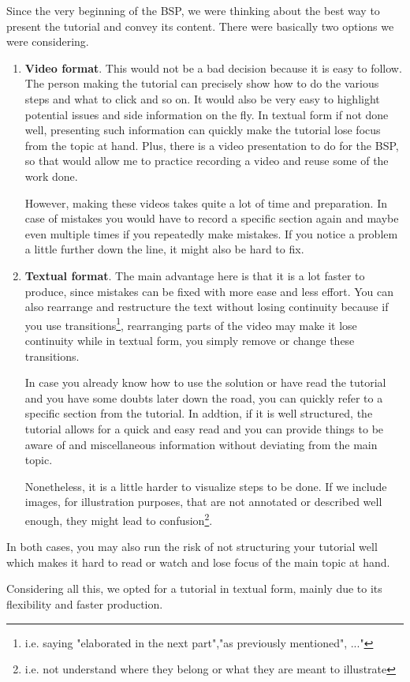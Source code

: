 
Since the very beginning of the BSP, we were thinking about the best
way to present the tutorial and convey its content. There were
basically two options we were considering. 

\begin{enumerate}
	 \item \textbf{Video format}. This would not be a bad decision because it
		is easy to follow. The person making the tutorial can
		precisely show how to do the various steps and what to click
		and so on. It would also be very easy to highlight potential
		issues and side information on the fly. In textual form if
		not done well, presenting such information can quickly make
		the tutorial lose focus from the topic at hand. Plus, there
		is a video presentation to do for the BSP, so that would
		allow me to practice recording a video and reuse some of the
		work done.

		However, making these videos takes quite a lot of time and
		preparation. In case of mistakes you would have to record a
		specific section again and maybe even multiple times if you
		repeatedly make mistakes. If you notice a problem a little
		further down the line, it might also be hard to fix. 

	\item \textbf{Textual format}. The main advantage here is that it is a lot
		faster to produce, since mistakes can be fixed with more ease
		and less effort. You can also rearrange and restructure the
		text without losing continuity because if you use
		transitions\footnote{i.e. saying "elaborated in the next
		part","as previously mentioned", ..."}, rearranging parts of
		the video may make it lose continuity while in textual form,
		you simply remove or change these transitions.

		In case you already know how to use the solution or have read
		the tutorial and you have some doubts later down the road, you
		can quickly refer to a specific section from the tutorial. In
		addtion, if it is well structured, the tutorial allows for a
		quick and easy read and you can provide things to be aware of
		and miscellaneous information without deviating from the main
		topic.

		Nonetheless, it is a little harder to visualize steps to be
		done. If we include images, for illustration purposes, that
		are not annotated or described well enough, they might lead to
		confusion\footnote{i.e. not understand where they belong or
		what they are meant to illustrate}.
\end{enumerate}
	
In both cases, you may also run the risk of not structuring your
tutorial well which makes it hard to read or watch and lose focus of
the main topic at hand.

Considering all this, we opted for a tutorial in textual form, mainly
due to its flexibility and faster production.
